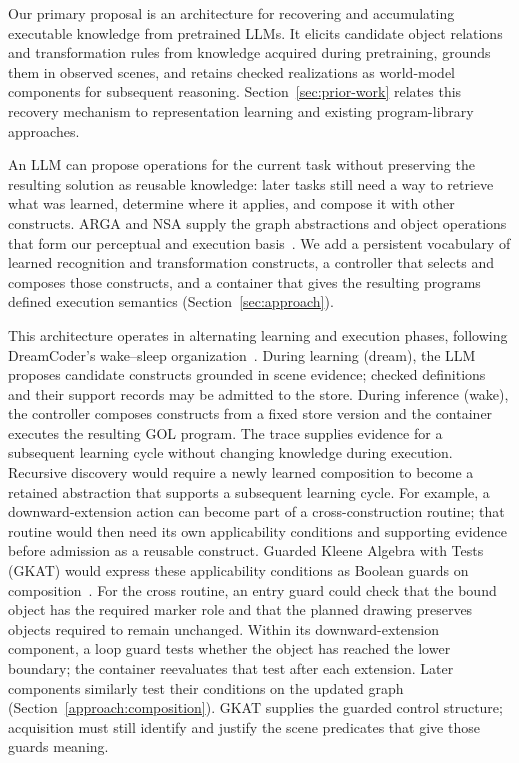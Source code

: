 \documentclass[11pt]{article}
\begin{document}
Our primary proposal is an architecture for recovering and accumulating executable knowledge from pretrained LLMs. It elicits candidate object relations and transformation rules from knowledge acquired during pretraining, grounds them in observed scenes, and retains checked realizations as world-model components for subsequent reasoning. Section~\ref{sec:prior-work} relates this recovery mechanism to representation learning and existing program-library approaches.

An LLM can propose operations for the current task without preserving the resulting solution as reusable knowledge: later tasks still need a way to retrieve what was learned, determine where it applies, and compose it with other constructs. ARGA and NSA supply the graph abstractions and object operations that form our perceptual and execution basis~\cite{arga,nsa}. We add a persistent vocabulary of learned recognition and transformation constructs, a controller that selects and composes those constructs, and a container that gives the resulting programs defined execution semantics (Section~\ref{sec:approach}).

This architecture operates in alternating learning and execution phases, following DreamCoder's wake--sleep organization~\cite{dreamcoder}. During learning (dream), the LLM proposes candidate constructs grounded in scene evidence; checked definitions and their support records may be admitted to the store. During inference (wake), the controller composes constructs from a fixed store version and the container executes the resulting GOL program. The trace supplies evidence for a subsequent learning cycle without changing knowledge during execution. Recursive discovery would require a newly learned composition to become a retained abstraction that supports a subsequent learning cycle. For example, a downward-extension action can become part of a cross-construction routine; that routine would then need its own applicability conditions and supporting evidence before admission as a reusable construct. Guarded Kleene Algebra with Tests (GKAT) would express these applicability conditions as Boolean guards on composition~\cite{gkat}. For the cross routine, an entry guard could check that the bound object has the required marker role and that the planned drawing preserves objects required to remain unchanged. Within its downward-extension component, a loop guard tests whether the object has reached the lower boundary; the container reevaluates that test after each extension. Later components similarly test their conditions on the updated graph (Section~\ref{approach:composition}). GKAT supplies the guarded control structure; acquisition must still identify and justify the scene predicates that give those guards meaning.
\end{document}

